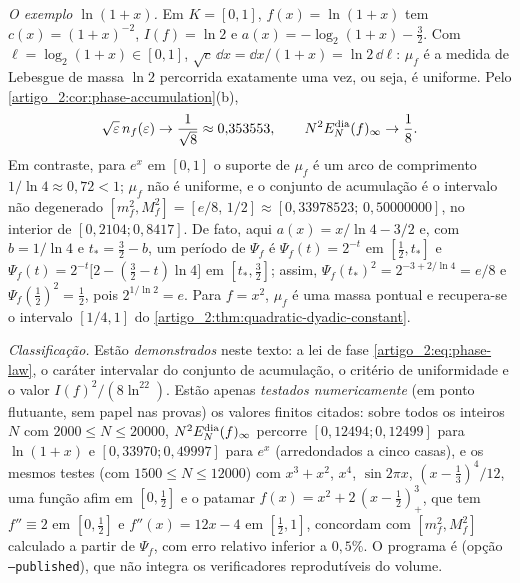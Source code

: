 \begin{remark}\label{map:artigo_2:12.9}
\label{artigo_2:rem:phase-examples}
\emph{O exemplo $\ln(1+x)$.} Em $K=[0,1]$, $f(x)=\ln(1+x)$ tem
$c(x)=(1+x)^{-2}$, $I(f)=\ln2$ e $a(x)=-\log_2(1+x)-\tfrac32$. Com
$\ell=\log_2(1+x)\in[0,1]$, $\sqrt{c}\,\dd x=\dd x/(1+x)=\ln2\,\dd\ell$:
$\mu_f$ é a medida de Lebesgue de massa $\ln2$ percorrida exatamente uma vez,
ou seja, é uniforme. Pelo \cref{artigo_2:cor:phase-accumulation}(b),
\[
 \sqrt\varepsilon\,n_f(\varepsilon)\to\frac1{\sqrt8}\approx0{,}353553,
 \qquad
 N^2E_N^{\rm dia}(f)_\infty\to\frac18 .
\]
Em contraste, para $e^x$ em $[0,1]$ o suporte de $\mu_f$ é um arco de
comprimento $1/\ln4\approx0{,}72<1$; $\mu_f$ não é uniforme, e o conjunto de
acumulação é o intervalo não degenerado $[m_f^2,M_f^2]=[e/8,\,1/2]\approx[0{,}33978523;\,0{,}50000000]$,
no interior de $[0{,}2104;0{,}8417]$. De fato, aqui $a(x)=x/\ln4-3/2$ e, com
$b=1/\ln4$ e $t_*=\tfrac32-b$, um período de $\Psi_f$ é
$\Psi_f(t)=2^{-t}$ em $[\tfrac12,t_*]$ e
$\Psi_f(t)=2^{-t}\bigl[2-(\tfrac32-t)\ln4\bigr]$ em $[t_*,\tfrac32]$; assim,
$\Psi_f(t_*)^2=2^{-3+2/\ln4}=e/8$ e $\Psi_f(\tfrac12)^2=\tfrac12$, pois $2^{1/\ln2}=e$.
Para $f=x^2$, $\mu_f$ é uma massa pontual e recupera-se o intervalo $[1/4,1]$ do
\cref{artigo_2:thm:quadratic-dyadic-constant}.

\emph{Classificação.} Estão \emph{demonstrados} neste texto: a lei de fase
\eqref{artigo_2:eq:phase-law}, o caráter intervalar do conjunto de acumulação, o
critério de uniformidade e o valor $I(f)^2/(8\ln^22)$. Estão apenas
\emph{testados numericamente} (em ponto flutuante, sem papel nas provas) os
valores finitos citados: sobre todos os inteiros $N$ com $2000\le N\le20000$,
$N^2E_N^{\rm dia}(f)_\infty$ percorre $[0{,}12494;0{,}12499]$ para $\ln(1+x)$ e
$[0{,}33970;0{,}49997]$ para $e^x$ (arredondados a cinco casas), e os mesmos testes (com $1500\le N\le12000$) com $x^3+x^2$, $x^4$, $\sin2\pi x$, $(x-\tfrac13)^4/12$,
uma função afim em $[0,\tfrac12]$ e o patamar $f(x)=x^2+2\,(x-\tfrac12)_+^3$,
que tem $f''\equiv2$ em $[0,\tfrac12]$ e $f''(x)=12x-4$ em $[\tfrac12,1]$, concordam
com $[m_f^2,M_f^2]$ calculado a partir de $\Psi_f$, com erro relativo inferior a $0{,}5\%$.
O programa é  (opção \texttt{--published}), que não integra os
verificadores reprodutíveis do volume.


\end{remark}
